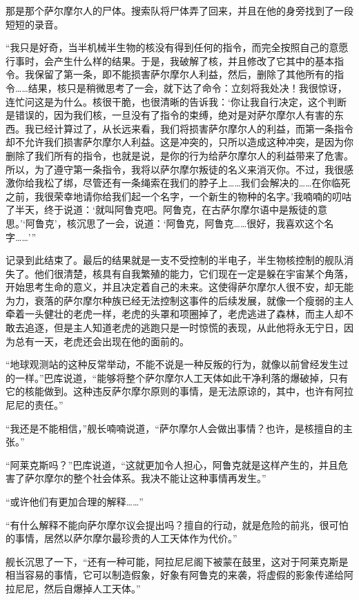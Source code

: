 那是那个萨尔摩尔人的尸体。搜索队将尸体弄了回来，并且在他的身旁找到了一段短短的录音。 

“我只是好奇，当半机械半生物的核没有得到任何的指令，而完全按照自己的意愿行事时，会产生什么样的结果。于是，我破解了核，并且修改了它其中的基本指令。我保留了第一条，即不能损害萨尔摩尔人利益，然后，删除了其他所有的指令……结果，核只是稍微思考了一会，就下达了命令：立刻将我处决！我很惊讶，连忙问这是为什么。核很干脆，也很清晰的告诉我：‘你让我自行决定，这个判断是错误的，因为我们核，一旦没有了指令的束缚，绝对是对萨尔摩尔人有害的东西。我已经计算过了，从长远来看，我们将损害萨尔摩尔人的利益，而第一条指令却不允许我们损害萨尔摩尔人利益。这是冲突的，只所以造成这种冲突，是因为你删除了我们所有的指令，也就是说，是你的行为给萨尔摩尔人的利益带来了危害。所以，为了遵守第一条指令，我将以萨尔摩尔叛徒的名义来消灭你。不过，我很感激你给我松了绑，尽管还有一条绳索在我们的脖子上……我们会解决的……在你临死之前，我很荣幸地请你给我们起一个名字，一个新生的物种的名字。’我喃喃的叨咕了半天，终于说道：‘就叫阿鲁克吧。阿鲁克，在古萨尔摩尔语中是叛徒的意思。’‘阿鲁克’，核沉思了一会，说道：‘阿鲁克，阿鲁克……很好，我喜欢这个名字……’” 

记录到此结束了。最后的结果就是一支不受控制的半电子，半生物核控制的舰队消失了。他们很清楚，核具有自我繁殖的能力，它们现在一定是躲在宇宙某个角落，开始思考生命的意义，并且决定着自己的未来。这使得萨尔摩尔人很不安，却无能为力，衰落的萨尔摩尔种族已经无法控制这事件的后续发展，就像一个瘦弱的主人牵着一头健壮的老虎一样，老虎的头罩和项圈掉了，老虎逃进了森林，而主人却不敢去追逐，但是主人知道老虎的逃跑只是一时惊慌的表现，从此他将永无宁日，因为总有一天，老虎还会出现在他的面前的。 

“地球观测站的这种反常举动，不能不说是一种反叛的行为，就像以前曾经发生过的一样。”巴库说道，“能够将整个萨尔摩尔人工天体如此干净利落的爆破掉，只有它的核能做到。这种违反萨尔摩尔原则的事情，是无法原谅的，其中，也许有阿拉尼尼的责任。” 

“我还是不能相信，”舰长喃喃说道，“萨尔摩尔人会做出事情？也许，是核擅自的主张。” 

“阿莱克斯吗？”巴库说道，“这就更加令人担心，阿鲁克就是这样产生的，并且危害了萨尔摩尔的整个社会体系。我决不能让这种事情再发生。” 

“或许他们有更加合理的解释……” 

“有什么解释不能向萨尔摩尔议会提出吗？擅自的行动，就是危险的前兆，很可怕的事情，居然以萨尔摩尔最珍贵的人工天体作为代价。” 

舰长沉思了一下，“还有一种可能，阿拉尼尼阁下被蒙在鼓里，这对于阿莱克斯是相当容易的事情，它可以制造假象，好象有阿鲁克的来袭，将虚假的影象传递给阿拉尼尼，然后自爆掉人工天体。” 

